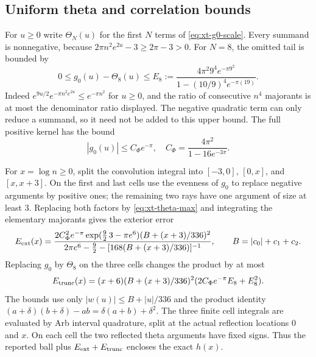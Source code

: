 \subsection{Uniform theta and correlation bounds}

For \(u\ge0\) write \(\Theta_N(u)\) for the first \(N\) terms of
\eqref{eq:xt-g0-scale}. Every summand is nonnegative, because
\(2\pi n^2e^{2u}-3\ge2\pi-3>0\). For \(N=8\), the omitted tail is bounded by
\begin{equation}\label{eq:xt-theta-tail}
 0\le g_0(u)-\Theta_8(u)\le
 E_8:=\frac{4\pi^2 9^4e^{-\pi9^2}}
 {1-(10/9)^4e^{-\pi(19)}}.
\end{equation}
Indeed \(e^{9u/2}e^{-\pi n^2e^{2u}}\le e^{-\pi n^2}\) for \(u\ge0\),
and the ratio of consecutive \(n^4\) majorants is at most the denominator
ratio displayed. The negative quadratic term can only reduce a summand,
so it need not be added to this upper bound. The full positive kernel has
the bound
\begin{equation}\label{eq:xt-theta-max}
 |g_0(u)|\le C_\Phi e^{-\pi},\quad
 C_\Phi=\frac{4\pi^2}{1-16e^{-3\pi}}.
\end{equation}

For \(x=\log n\ge0\), split the convolution integral into
\([-3,0]\), \([0,x]\), and \([x,x+3]\). On the first and last cells use the
evenness of \(g_0\) to replace negative arguments by positive ones; the
remaining two rays have one argument of size at least \(3\). Replacing
both factors by \eqref{eq:xt-theta-max} and integrating the elementary
majorants gives the exterior error
\begin{equation}\label{eq:xt-exterior-tail}
 E_{\rm ext}(x)=
 \frac{2C_\Phi^2 e^{-\pi}\exp(\tfrac92\,3-\pi e^6)
       (B+(x+3)/336)^2}
      {2\pi e^6-\tfrac92-
       [168(B+(x+3)/336)]^{-1}},\qquad B=|c_0|+c_1+c_2.
\end{equation}
Replacing \(g_0\) by \(\Theta_8\) on the three cells changes the product by
at most
\begin{equation}\label{eq:xt-trunc-tail}
 E_{\rm trunc}(x)=(x+6)(B+(x+3)/336)^2(2C_\Phi e^{-\pi}E_8+E_8^2).
\end{equation}
The bounds use only \(|w(u)|\le B+|u|/336\) and the product identity
\((a+\delta)(b+\delta)-ab=\delta(a+b)+\delta^2\).
The three finite cell integrals are evaluated by Arb interval
quadrature, split at the actual reflection locations \(0\) and \(x\).
On each cell the two reflected theta arguments have fixed signs. Thus the
reported ball plus \(E_{\rm ext}+E_{\rm trunc}\) encloses the exact \(h(x)\).

